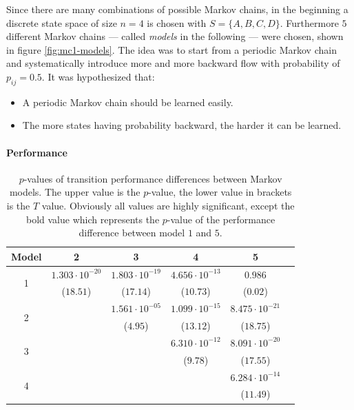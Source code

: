 Since there are many combinations of possible Markov chains, in the beginning a discrete state space of size $n = 4$ is chosen with $S = \{A,B,C,D\}$. Furthermore $5$ different Markov chains --- called \emph{models} in the following --- were chosen, shown in figure \ref{fig:mc1-models}. The idea was to start from a periodic Markov chain and systematically introduce more and more backward flow with probability of $p_{ij} = 0.5$. It was hypothesized that:

\begin{itemize}
\item A periodic Markov chain should be learned easily.
\item The more states having probability backward, the harder it can be learned.
\end{itemize}

\paragraph{Performance}

\begin{table}[!b]
\centering
\begin{tabular}{c|ccccc}
Model & 2 & 3 & 4 & 5 \\
\hline
\multirow{2}{*}{1} & $1.303\cdot 10^{-20}$ & $1.803\cdot 10^{-19}$ & $4.656\cdot 10^{-13}$ & $\mathbf{0.986}$ \\
 & ($18.51$) & ($17.14$) & ($10.73$) & ($0.02$) \\
\hline
\multirow{2}{*}{2} & & $1.561\cdot 10^{-05}$ & $1.099\cdot 10^{-15}$ & $8.475\cdot 10^{-21}$ \\
& & ($4.95$) & ($13.12$) & ($18.75$) \\
\hline
\multirow{2}{*}{3} & & & $6.310\cdot 10^{-12}$ & $8.091\cdot 10^{-20}$ \\
& & & ($9.78$) & ($17.55$) \\
\hline
\multirow{2}{*}{4} & & & & $6.284\cdot 10^{-14}$ \\
& & & & ($11.49$) \\
\end{tabular}
\vspace{5pt}
\caption[p-values of performance differences between Markov models]{$p$-values of transition performance differences between Markov models. The upper value is the $p$-value, the lower value in brackets is the $T$ value. Obviously all values are highly significant, except the bold value which represents the $p$-value of the performance difference between model $1$ and $5$.}
\label{tb:mc1-t-test}
\end{table}

